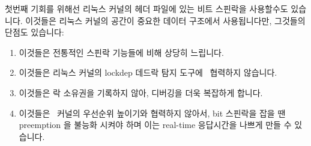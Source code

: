 첫번째 기회를 위해선 리눅스 커널의  헤더
파일에 있는 비트 스핀락을 사용할수도 있습니다.
이것들은 리눅스 커널의 공간이 중요한 데이터 구조에서 사용됩니다만, 그것들의
단점도 있습니다:

\begin{enumerate}
\item	이것들은 전통적인 스핀락 기능들에 비해 상당히 느립니다.
\item	이것들은 리눅스 커널의 lockdep 데드락 탐지
	도구에~\cite{JonathanCorbet2006lockdep} 협력하지 않습니다.
\item	이것들은 락 소유권을 기록하지 않아, 디버깅을 더욱 복잡하게 합니다.
\item	이것들은 \rt\ 커널의 우선순위 높이기와 협력하지 않아서, bit 스핀락을
	잡을 땐 preemption 을 불능화 시켜야 하며 이는 real-time 응답시간을
	나쁘게 만들 수 있습니다.

\end{enumerate}

